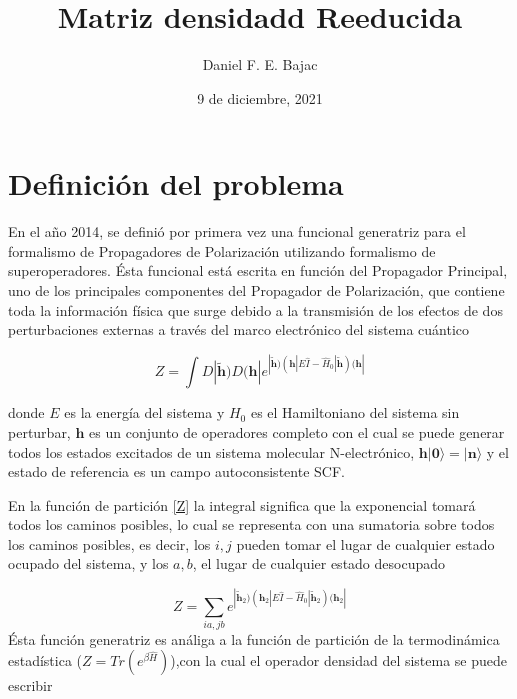 \documentclass[
	12pt, %
]{fphw}
\title{Matriz densidadd Reeducida} %
\author{Daniel F. E. Bajac} %
\date{9 de diciembre, 2021} %
\institute{Universidad Nacional del Nordeste \\ Dep artamento de Física} %
\begin{document}
\maketitle %


\section*{Definición del problema}

En el año 2014, se definió por primera vez una funcional generatriz para el formalismo
de Propagadores de Polarización utilizando formalismo de superoperadores\cite{QFT}. Ésta funcional 
está escrita en función del Propagador Principal, uno de los principales componentes del Propagador
de Polarización, que contiene toda la información física que surge debido a la transmisión
de los efectos de dos perturbaciones externas a través del marco electrónico del sistema cuántico

\begin{equation}\label{Z}
	Z = \int D| \bm{\widetilde{h}} ) D (\bm{h}|  e^{| \bm{\widetilde{h}} ) (\bm{h}| E \hat{I} - \hat{H}_0 | \bm{\widetilde{h}} )   (\bm{h}|}
\end{equation}

donde $E$ es la energía del sistema y $H_0$ es el Hamiltoniano del sistema sin perturbar, $\bm{h}$ es un conjunto de operadores 
completo con el cual se puede generar todos los estados excitados de un sistema molecular N-electrónico, 
$\bm{h} | \bm{0} \rangle = |\bm{n}\rangle$  y el estado de referencia
es un campo autoconsistente SCF.




En la función de partición \ref{Z} 
la integral significa que la exponencial tomará todos los caminos posibles, lo cual se representa con una sumatoria 
sobre todos los caminos posibles, es decir, los ${i,j}$ pueden tomar el lugar de cualquier estado ocupado del sistema, 
y los ${a,b}$, el lugar de cualquier estado desocupado   

\begin{equation}\label{Z_sum}
	Z = \sum_{ia,jb}  e^{| \bm{\widetilde{h}}_2 ) (\bm{h}_2| E \hat{I} - \hat{H}_0 | \bm{\widetilde{h}}_2 )   (\bm{h}_2|}
\end{equation}
Ésta función generatriz es análiga a la función de partición de la termodinámica estadística \cite{functional} 
($Z = Tr (e^{\beta \hat{H}})$),con la cual el operador densidad  del sistema se puede escribir
\end{document}
